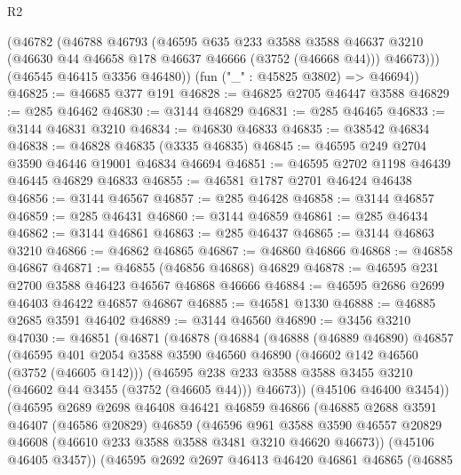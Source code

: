 \begin{lexlean}{R2}
\begin{coremodule}
        (@46782
          (@46788
            @46793
            (@46595
              @635
              @233
              @3588
              @3588
              @46637
              @3210
              (@46630 @44 @46658 @178 @46637 @46666 (@3752 (@46668 @44)))
              @46673)))
        (@46545 @46415 @3356 @46480))
      (fun ("_" : @45825 @3802) => @46694))
@46825 := @46685 @377 @191
@46828 := @46825 @2705 @46447 @3588
@46829 := @285 @46462
@46830 := @3144 @46829
@46831 := @285 @46465
@46833 := @3144 @46831 @3210
@46834 := @46830 @46833
@46835 := @38542 @46834
@46838 := @46828 @46835 (@3335 @46835)
@46845 := @46595 @249 @2704 @3590 @46446 @19001 @46834 @46694
@46851 := @46595 @2702 @1198 @46439 @46445 @46829 @46833
@46855 := @46581 @1787 @2701 @46424 @46438
@46856 := @3144 @46567
@46857 := @285 @46428
@46858 := @3144 @46857
@46859 := @285 @46431
@46860 := @3144 @46859
@46861 := @285 @46434
@46862 := @3144 @46861
@46863 := @285 @46437
@46865 := @3144 @46863 @3210
@46866 := @46862 @46865
@46867 := @46860 @46866
@46868 := @46858 @46867
@46871 := @46855 (@46856 @46868) @46829
@46878 := @46595 @231 @2700 @3588 @46423 @46567 @46868 @46666
@46884 := @46595 @2686 @2699 @46403 @46422 @46857 @46867
@46885 := @46581 @1330
@46888 := @46885 @2685 @3591 @46402
@46889 := @3144 @46560
@46890 := @3456 @3210
@47030 := @46851
    (@46871
      (@46878
        (@46884
          (@46888
            (@46889 @46890)
            @46857
            (@46595
              @401
              @2054
              @3588
              @3590
              @46560
              @46890
              (@46602 @142 @46560 (@3752 (@46605 @142)))
              (@46595
                @238
                @233
                @3588
                @3588
                @3455
                @3210
                (@46602 @44 @3455 (@3752 (@46605 @44)))
                @46673))
            (@45106 @46400 @3454))
          (@46595
            @2689
            @2698
            @46408
            @46421
            @46859
            @46866
            (@46885
              @2688
              @3591
              @46407
              (@46586 @20829)
              @46859
              (@46596
                @961
                @3588
                @3590
                @46557
                @20829
                @46608
                (@46610 @233 @3588 @3588 @3481 @3210 @46620 @46673))
              (@45106 @46405 @3457))
            (@46595
              @2692
              @2697
              @46413
              @46420
              @46861
              @46865
              (@46885

\end{coremodule}
\end{lexlean}
